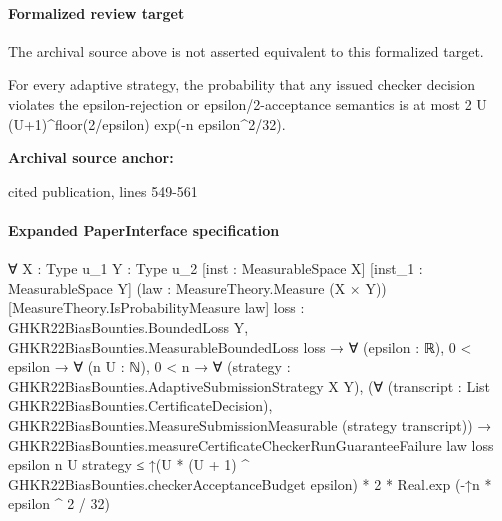 \documentclass[10pt]{article}
\begin{document}
\paragraph{Formalized review target}
The archival source above is not asserted equivalent to this formalized target.
\begin{ReviewVerbatim}
For every adaptive strategy, the probability that any issued checker decision violates the epsilon-rejection or epsilon/2-acceptance semantics is at most 2 U (U+1)^floor(2/epsilon) exp(-n epsilon^2/32).
\end{ReviewVerbatim}

\textbf{Archival source anchor:} {\footnotesize\raggedright cited publication, lines 549-\allowbreak{}561\par}
\paragraph{Expanded PaperInterface specification}
\begin{ReviewVerbatim}
∀ {X : Type u_1} {Y : Type u_2} [inst : MeasurableSpace X] [inst_1 : MeasurableSpace Y]
  (law : MeasureTheory.Measure (X × Y)) [MeasureTheory.IsProbabilityMeasure law]
  {loss : GHKR22BiasBounties.BoundedLoss Y},
  GHKR22BiasBounties.MeasurableBoundedLoss loss →
    ∀ (epsilon : ℝ),
      0 < epsilon →
        ∀ (n U : ℕ),
          0 < n →
            ∀ (strategy : GHKR22BiasBounties.AdaptiveSubmissionStrategy X Y),
              (∀ (transcript : List GHKR22BiasBounties.CertificateDecision),
                  GHKR22BiasBounties.MeasureSubmissionMeasurable (strategy transcript)) →
                GHKR22BiasBounties.measureCertificateCheckerRunGuaranteeFailure law loss epsilon n U strategy ≤
                  ↑(U * (U + 1) ^ GHKR22BiasBounties.checkerAcceptanceBudget epsilon) * 2 *
                    Real.exp (-↑n * epsilon ^ 2 / 32)
\end{ReviewVerbatim}
\end{document}
